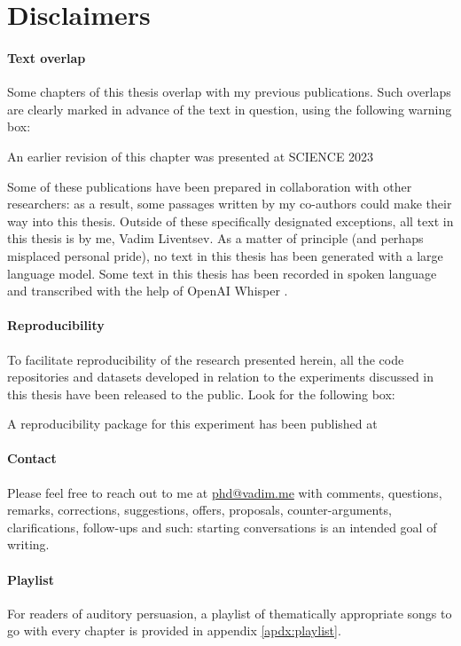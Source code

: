 \newpage
\section*{Disclaimers}

\paragraph{Text overlap}

Some chapters of this thesis overlap with my previous publications.
Such overlaps are clearly marked in advance of the text in question, using the following warning box:

\begin{remark}
    An earlier revision of this chapter \cite{liventsevNeurogeneticProgrammingFramework2021} was presented at SCIENCE 2023
\end{remark}

Some of these publications have been prepared in collaboration with other researchers: as a result, some passages written by my co-authors could make their way into this thesis.
Outside of these specifically designated exceptions, all text in this thesis is by me, Vadim Liventsev.
As a matter of principle (and perhaps misplaced personal pride), no text in this thesis has been generated with a large language model.
Some text in this thesis has been recorded in spoken language and transcribed with the help of OpenAI Whisper \cite{radfordRobustSpeechRecognition2022}.

\paragraph{Reproducibility}

To facilitate reproducibility of the research presented herein, all the code repositories and datasets developed in relation to the experiments discussed in this thesis have been released to the public. Look for the following box:

\begin{remark}
    A reproducibility package for this experiment has been published at \cite{liventsevReplicationPackageFully2023}
\end{remark}

\paragraph{Contact}

Please feel free to reach out to me at \url{phd@vadim.me} with comments, questions, remarks, corrections, suggestions, offers, proposals, counter-arguments, clarifications, follow-ups and such: starting conversations is an intended goal of writing.

\paragraph{Playlist}

For readers of auditory persuasion, a playlist of thematically appropriate songs to go with every chapter is provided in appendix \ref{apdx:playlist}.
